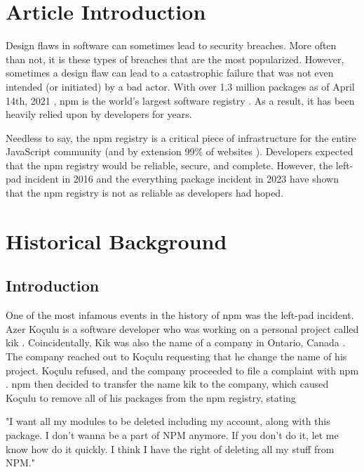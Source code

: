 \documentclass[acmsmall]{acmart}
\begin{document}
\maketitle

\fancyfoot{}
\thispagestyle{empty}

\section{Article Introduction}
Design flaws in software can sometimes lead to security breaches. More often than
not, it is these types of breaches that are the most popularized. However, sometimes
a design flaw can lead to a catastrophic failure that was not even intended
(or initiated) by a bad actor.
With over 1.3 million packages as of April 14th, 2021 \cite{npmblog-stats}, npm is
the world's largest software registry \cite{aboutnpm,w3schools}. As a
result, it has been heavily relied upon by developers for years.

Needless to say, the npm registry is a critical piece of infrastructure for the
entire JavaScript community (and by extension 99\% of websites \cite{w3techs}). Developers
expected that the npm registry would be reliable, secure, and complete. However, the
left-pad incident in 2016 \cite{npmblog-leftpad} and the everything package incident
in 2023 \cite{youtube-everything} have shown that the npm registry is not as reliable
as developers had hoped.

\section{Historical Background}
\subsection{Introduction}
One of the most infamous events in the history of npm was the left-pad incident.
Azer Koçulu is a software developer who was working on a personal project called
kik \cite{qz}. Coincidentally, Kik was also the name of a company in
Ontario, Canada \cite{qz, crunchbase}. The company reached out to Koçulu
requesting that he change the name of his project. Koçulu refused, and the company
proceeded to file a complaint with npm \cite{qz}. npm then decided to transfer the name
kik to the company, which caused Koçulu to remove all of his packages from the
npm registry, stating

"I want all my modules to be deleted including my account, along with this package.
I don't wanna be a part of NPM anymore. If you don't do it, let me know how do it quickly.
I think I have the right of deleting all my stuff from NPM." \cite{medium-mikeroberts}
\end{document}
